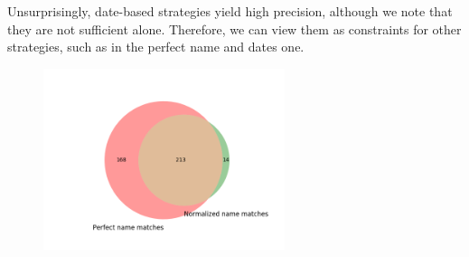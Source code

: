 Unsurprisingly, date-based strategies yield high precision, although we note that they are not sufficient alone. Therefore, we can view them as constraints for other strategies, such as in the perfect name and dates one.

\begin{figure}[h]
  \begin{center}
   \includegraphics[height=200px]{images/plots/names.png}
   \label{fig:perfectandnormvenn}
  \end{center}
\end{figure}

